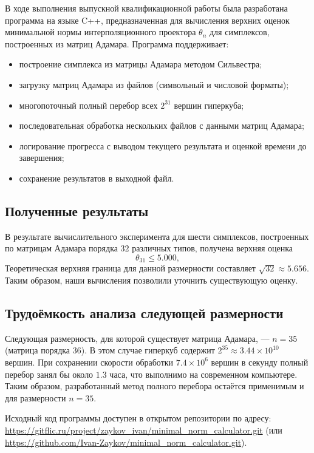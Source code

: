 \documentclass[a4paper,12pt]{article}
\theoremstyle{indented}
\begin{document}
В ходе выполнения выпускной квалификационной работы была разработана программа на языке C++, предназначенная для вычисления верхних оценок минимальной нормы интерполяционного проектора $\theta_n$ для симплексов, построенных из матриц Адамара. Программа поддерживает:

\begin{itemize}
    \item построение симплекса из матрицы Адамара методом Сильвестра;
    \item загрузку матриц Адамара из файлов (символьный и числовой форматы);
    \item многопоточный полный перебор всех $2^{31}$ вершин гиперкуба;
    \item последовательная обработка нескольких файлов с данными матриц Адамара;
    \item логирование прогресса с выводом текущего результата и оценкой времени до завершения;
    \item сохранение результатов в выходной файл.
\end{itemize}

\subsection*{Полученные результаты}

В результате вычислительного эксперимента для шести симплексов, построенных по матрицам Адамара порядка $32$ различных типов, получена верхняя оценка
\[
\theta_{31} \le 5.000,
\]
Теоретическая верхняя граница для данной размерности составляет $\sqrt{32} \approx 5.656$. Таким образом, наши вычисления позволили уточнить существующую оценку.

\subsection*{Трудоёмкость анализа следующей размерности}

Следующая размерность, для которой существует матрица Адамара, — $n = 35$ (матрица порядка $36$). В этом случае гиперкуб содержит $2^{35} \approx 3.44 \times 10^{10}$ вершин. При сохранении скорости обработки $7.4 \times 10^6$ вершин в секунду полный перебор занял бы около $1.3$ часа, что выполнимо на современном компьютере. Таким образом, разработанный метод полного перебора остаётся применимым и для размерности $n = 35$.

Исходный код программы доступен в открытом репозитории по адресу:
\url{https://gitflic.ru/project/zaykov_ivan/minimal_norm_calculator.git} (или \url{https://github.com/Ivan-Zaykov/minimal_norm_calculator.git}).
\end{document}
